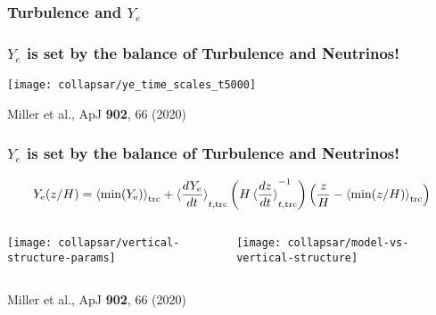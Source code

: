 \documentclass[]{beamer}
\newcommand{\paren}[1]{\left( #1 \right)}
\begin{document}
\begin{frame}
  \frametitle{Turbulence and $Y_e$}
\end{frame}

\begin{frame}
  \frametitle{$Y_e$ is set by the balance of Turbulence and
    Neutrinos!}
  \begin{center}
    \texttt{[image: collapsar/ye\_time\_scales\_t5000]}
  \end{center}
  {\footnotesize Miller et al., ApJ \textbf{902}, 66 (2020)}
\end{frame}

\begin{frame}
  \frametitle{$Y_e$ is set by the balance of Turbulence and
    Neutrinos!}
  \begin{displaymath}
      Y_{\rm e}(z/H) = \braket{\text{min}(Y_{\rm e})}_{\text{trc}}
      + \braket{\frac{d Y_{\rm e}}{dt}}_{t,\text{trc}} \paren{H\braket{\frac{dz}{dt}}_{t,\text{trc}}^{-1}}\paren{\frac{z}{H} - \braket{\text{min}(z/H)}_{\text{trc}}}
    \end{displaymath}
    \begin{columns}
      \begin{column}{6cm}
        \texttt{[image: collapsar/vertical-structure-params]}
      \end{column}
      \begin{column}{6cm}
        \texttt{[image: collapsar/model-vs-vertical-structure]}
      \end{column}
    \end{columns}
    {\footnotesize Miller et al., ApJ \textbf{902}, 66 (2020)}
  \end{frame}
\end{document}
